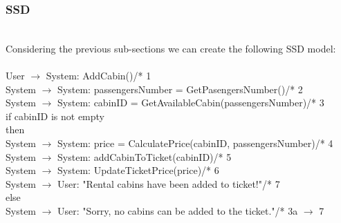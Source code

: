 \subsubsection{SSD}
\creator{\studentC}\\
Considering the previous sub-sections we can create the following SSD model:\\\\
User $\rightarrow$ System: AddCabin()\hfill /* 1\\
System $\rightarrow$ System: passengersNumber = GetPasengersNumber()\hfill /* 2\\
System $\rightarrow$ System: cabinID = GetAvailableCabin(passengersNumber)\hfill /* 3\\
if cabinID is not empty\\
\phantom{x}\hspace{2ex}then\\
\phantom{x}\hspace{2ex}\phantom{x}\hspace{2ex}System $\rightarrow$ System: price = CalculatePrice(cabinID, passengersNumber)\hfill /* 4\\
\phantom{x}\hspace{2ex}\phantom{x}\hspace{2ex}System $\rightarrow$ System: addCabinToTicket(cabinID)\hfill /* 5\\
\phantom{x}\hspace{2ex}\phantom{x}\hspace{2ex}System $\rightarrow$ System: UpdateTicketPrice(price)\hfill /* 6\\
\phantom{x}\hspace{2ex}\phantom{x}\hspace{2ex}System $\rightarrow$ User: "Rental cabins have been added to ticket!"\hfill /* 7\\
else\\
\phantom{x}\hspace{2ex}System $\rightarrow$ User: "Sorry, no cabins can be added to the ticket."\hfill /* 3a $\rightarrow$ 7 \\
\newpage


